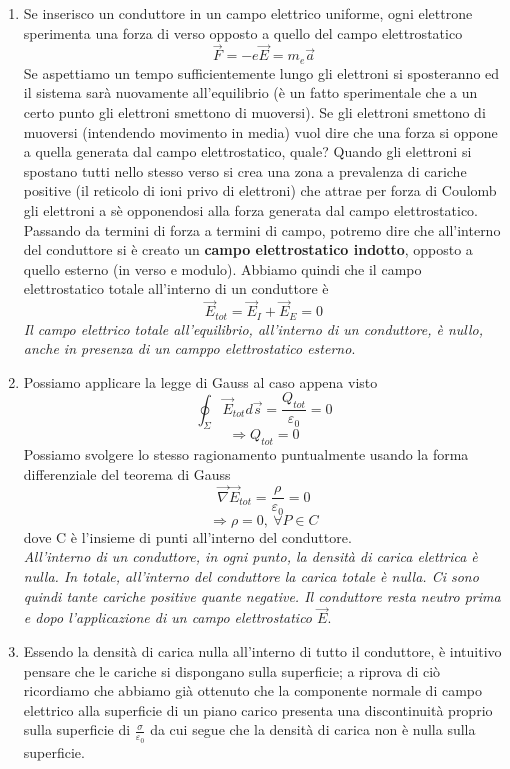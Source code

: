 \documentclass[10pt,a4paper]{article}
\begin{document}
\begin{enumerate}
\item	Se inserisco un conduttore in un campo elettrico uniforme, ogni elettrone sperimenta una forza di verso opposto a quello del campo elettrostatico
\[\vec{F} = -e\vec{E} = m_e \vec{a}\]
Se aspettiamo un tempo sufficientemente lungo gli elettroni si sposteranno ed il sistema sarà nuovamente all'equilibrio (è un fatto sperimentale che a un certo punto gli elettroni smettono di muoversi). Se gli elettroni smettono di muoversi (intendendo movimento in media) vuol dire che una forza si oppone a quella generata dal campo elettrostatico, quale? Quando gli elettroni si spostano tutti nello stesso verso si crea una zona a prevalenza di cariche positive (il reticolo di ioni privo di elettroni) che attrae per forza di Coulomb gli elettroni a sè opponendosi alla forza generata dal campo elettrostatico. Passando da termini di forza a termini di campo, potremo dire che all'interno del conduttore si è creato un \textbf{campo elettrostatico indotto}, opposto a quello esterno (in verso e modulo). Abbiamo quindi che il campo elettrostatico totale all'interno di un conduttore è
\[\vec{E}_{tot} = \vec{E}_I+\vec{E}_E = 0\]
\textit{Il campo elettrico totale all'equilibrio, all'interno di un conduttore, è nullo, anche in presenza di un camppo elettrostatico esterno}.
\item Possiamo applicare la legge di Gauss al caso appena visto 
\[\oint_{\Sigma}\vec{E}_{tot}d\vec{s}= \frac{Q_{tot}}{\varepsilon_0} = 0\]
\[\Rightarrow Q_{tot} = 0\]
Possiamo svolgere lo stesso ragionamento puntualmente usando la forma differenziale del teorema di Gauss
\[\vec{\nabla}\vec{E}_{tot}=\frac{\rho}{\varepsilon_0}=0 \]
\[\Rightarrow \rho = 0,\ \forall P \in C\]
dove C è l'insieme di punti all'interno del conduttore. \\
\textit{All'interno di un conduttore, in ogni punto, la densità di carica elettrica è nulla. In totale, all'interno del conduttore la carica totale è nulla. Ci sono quindi tante cariche positive quante negative. Il conduttore resta neutro prima e dopo l'applicazione di un campo elettrostatico $\vec{E}$}.
\item Essendo la densità di carica nulla all'interno di tutto il conduttore, è intuitivo pensare che le cariche si dispongano sulla superficie; a riprova di ciò ricordiamo che abbiamo già ottenuto che la componente normale di campo elettrico alla superficie di un piano carico presenta una discontinuità proprio sulla superficie di \(\frac{\sigma}{\varepsilon_0}\) da cui segue che la densità di carica non è nulla sulla superficie. \\

\end{enumerate}
\end{document}
